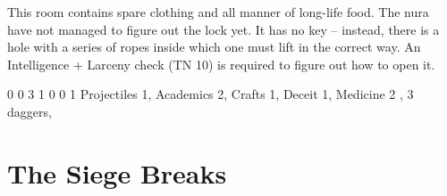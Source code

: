 \begin{multicols}{2}

This room contains spare clothing and all manner of long-life food.
The nura have not managed to figure out the lock yet.
It has no key -- instead, there is a hole with a series of ropes inside which one must lift in the correct way.
An Intelligence + Larceny check (TN 10) is required to figure out how to open it.





{0}%
{0}%
{{3}%
{1}%
{0}}%
{0}%
{1}%
{Projectiles 1, Academics 2, Crafts 1, Deceit 1, Medicine 2
}%
{\shortsword, 3 daggers, \partialleather}%
{}

\end{multicols}

\section{The Siege Breaks}
\label{siege}

\begin{multicols}{2}

\end{multicols}

